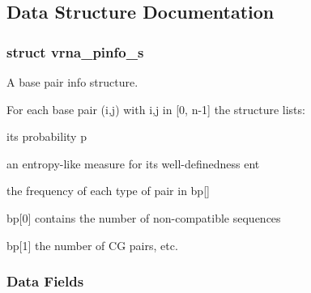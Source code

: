 \subsection{Data Structure Documentation}
\label{structvrna__pinfo__s}
\subsubsection{struct vrna\+\_\+pinfo\+\_\+s}
A base pair info structure. 

For each base pair (i,j) with i,j in \mbox{[}0, n-\/1\mbox{]} the structure lists\+:
\begin{DoxyItemize}
\item its probability \textquotesingle{}p\textquotesingle{}
\item an entropy-\/like measure for its well-\/definedness \textquotesingle{}ent\textquotesingle{}
\item the frequency of each type of pair in \textquotesingle{}bp\mbox{[}\mbox{]}\textquotesingle{}
\begin{DoxyItemize}
\item \textquotesingle{}bp\mbox{[}0\mbox{]}\textquotesingle{} contains the number of non-\/compatible sequences
\item \textquotesingle{}bp\mbox{[}1\mbox{]}\textquotesingle{} the number of CG pairs, etc. 
\end{DoxyItemize}
\end{DoxyItemize}\subsubsection*{Data Fields}
